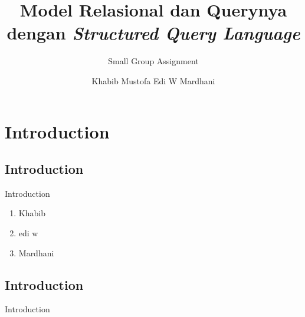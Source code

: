 \documentclass[xcolor=table,t, aspectratio=169]{beamer}
\title[Model Relasional dan Query-nya]{Model Relasional dan Querynya \newline dengan \textit{Structured Query Language}}
\subtitle{Small Group Assignment}
\date{}
\author{Khabib Mustofa \newline Edi W \newline Mardhani}
\institute[UGM, Yogyakarta, Indonesia]{Dept of  Computer Science and Electronics, Universitas Gadjah Mada}
\begin{document}
\frontframe
\section{Introduction}
\subsection{Introduction}
\begin{frame}{Introduction}
\footnotesize
    \begin{enumerate}
        \item Khabib
        \item edi w
        \item Mardhani
    \end{enumerate}
\end{frame}
\subsection{Introduction}
\begin{frame}{Introduction}  
\end{frame}

\end{document}

